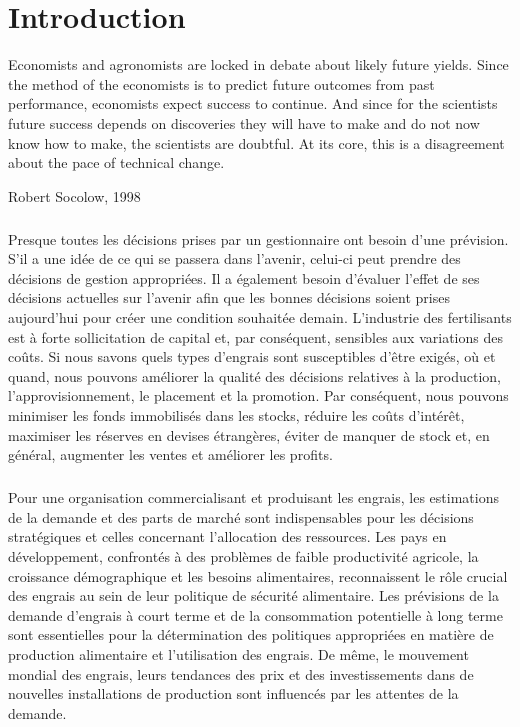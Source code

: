 \chapter*{Introduction}

\epigraph{Economists and agronomists are locked in debate about likely
future yields. Since the method of the economists is to predict
future outcomes from past performance, economists expect
success to continue. And since for the scientists future success
depends on discoveries they will have to make and do not now
know how to make, the scientists are doubtful. At its core, this is
a disagreement about the pace of technical change.}{Robert
Socolow, 1998}
\paragraph{}
Presque toutes les décisions prises par un gestionnaire ont besoin d'une prévision. S'il a une idée de ce qui se passera dans l'avenir, celui-ci peut prendre des décisions de gestion appropriées. Il a également besoin d'évaluer l'effet de ses décisions actuelles sur l'avenir afin que les bonnes décisions soient prises aujourd'hui pour créer une condition souhaitée demain. L’industrie des fertilisants est à forte sollicitation de capital et, par conséquent, sensibles aux variations des coûts. Si nous savons quels types d'engrais sont susceptibles d'être exigés, où et quand, nous pouvons améliorer la qualité des décisions relatives à la production, l'approvisionnement, le placement et la promotion. Par conséquent, nous pouvons minimiser les fonds immobilisés dans les stocks, réduire les coûts d'intérêt, maximiser les réserves en devises étrangères, éviter de manquer de stock et, en général, augmenter les ventes et améliorer les profits.
\paragraph{}
Pour une organisation commercialisant et produisant les engrais, les estimations de la demande et des parts de marché sont indispensables pour les décisions stratégiques et celles concernant l'allocation des ressources. Les pays en développement, confrontés à des problèmes de faible productivité agricole, la croissance démographique et les besoins alimentaires, reconnaissent le rôle crucial des engrais au sein de leur politique de sécurité alimentaire. Les prévisions de la demande d'engrais à court terme et de la consommation potentielle à long terme sont essentielles pour la détermination des politiques appropriées en matière de production alimentaire et l'utilisation des engrais. De même, le mouvement mondial des engrais, leurs tendances des prix et des investissements dans de nouvelles installations de production sont influencés par les attentes de la demande.
